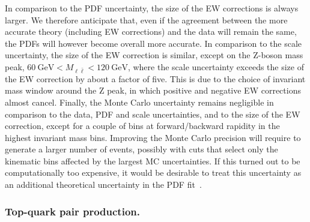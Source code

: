 In comparison to the PDF uncertainty, the size of the EW corrections is always
larger. We therefore anticipate that, even if the agreement between the more
accurate theory (including EW corrections) and the data will remain the same,
the PDFs will however become overall more accurate. In comparison to the scale
uncertainty, the size of the EW correction is similar, except on the Z-boson
mass peak, $\SI{60}{\giga\electronvolt}<M_{\ell\bar\ell}<\SI{120}{\giga\electronvolt}$, where the scale uncertainty exceeds
the size of the EW correction by about a factor of five. This is due to the choice
of invariant mass window around the Z peak, in which positive and negative EW corrections almost cancel.
Finally, the Monte Carlo uncertainty remains negligible
in comparison to the data, PDF and scale uncertainties, and to the size of the
EW correction, except for a couple of bins at forward/backward rapidity in the highest
invariant mass bins. Improving the Monte Carlo precision will require to
generate a larger number of events, possibly with cuts that select
only the kinematic bins affected by the largest MC uncertainties. If this
turned out to be computationally too expensive, it would be desirable to treat
this uncertainty as an additional theoretical uncertainty in the PDF
fit~\cite{Ball:2018lag}.


\subsubsection{Top-quark pair production.}
\label{sec:toppair}

